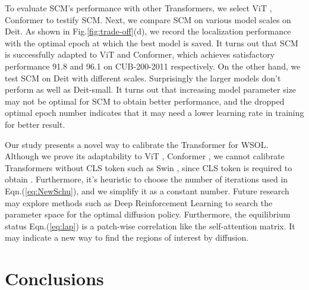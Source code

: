 \documentclass[runningheads]{llncs}
\begin{document}
To evaluate SCM's performance with other Transformers, we select ViT \cite{DBLP:journals/corr/abs-2103-13915}, Conformer \cite{gulati2020conformer} to testify SCM. Next, we compare SCM on various model scales on Deit.
As shown in Fig.\ref{fig:trade-off}(d), we record the localization performance with the optimal epoch at which the best model is saved. It turns out that SCM is successfully adapted to ViT and Conformer, which achieves satisfactory performance 91.8 and 96.1 on CUB-200-2011 respectively. On the other hand, we test SCM on Deit with different scales. Surprisingly the larger models don't perform as well as Deit-small. It turns out that increasing model parameter size may not be optimal for SCM to obtain better performance, and the dropped optimal epoch number indicates that it may need a lower learning rate in training for better result. 

Our study presents a novel way to calibrate the Transformer for WSOL. Although we prove its adaptability to ViT \cite{DBLP:journals/corr/abs-2103-13915}, Conformer \cite{gulati2020conformer}, we cannot calibrate Transformers without CLS token such as Swin \cite{Liu2021SwinTH}, since CLS token is required to obtain . Furthermore, it's heuristic to choose the number of iterations used in Eqn.(\ref{eq:NewSchu}), and we simplify it as a constant number. Future research may explore methods such as Deep Reinforcement Learning to search the parameter space for the optimal diffusion policy. 
Furthermore, the equilibrium status Eqn.(\ref{eq:lap}) is a patch-wise correlation like the self-attention matrix. It may indicate a new way to find the regions of interest by diffusion. 


\section{Conclusions}
\end{document}
